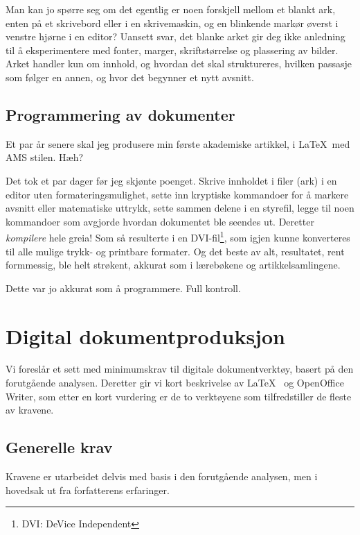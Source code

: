 Man kan jo spørre seg om det egentlig er noen forskjell mellom et blankt ark, enten på et skrivebord eller i en skrivemaskin, og en blinkende markør øverst i venstre hjørne i en editor? Uansett svar, det blanke arket gir deg ikke anledning til å eksperimentere med fonter, marger, skriftstørrelse og plassering av bilder. Arket handler kun om innhold, og hvordan det skal struktureres, hvilken passasje som følger en annen, og hvor det begynner et nytt avsnitt.

\subsection{Programmering av dokumenter}

Et par år senere skal jeg produsere min første akademiske artikkel, i \LaTeX~med  AMS stilen. Hæh?

Det tok et par dager før jeg skjønte poenget. Skrive innholdet i filer (ark) i en editor uten formateringsmulighet, sette inn kryptiske kommandoer for å markere avsnitt eller matematiske uttrykk, sette sammen delene i en styrefil, legge til noen kommandoer som avgjorde hvordan dokumentet ble seendes ut. Deretter {\em kompilere} hele greia! Som så resulterte i  en DVI-fil\footnote{DVI: DeVice Independent}, som igjen kunne konverteres til alle mulige trykk- og printbare formater. Og det beste av alt, resultatet, rent formmessig, ble helt strøkent, akkurat som i lærebøkene og artikkelsamlingene.

Dette var jo akkurat som å programmere. Full kontroll.


\section{Digital dokumentproduksjon}

Vi foreslår et sett med minimumskrav til digitale dokumentverktøy, basert på  den forutgående analysen. Deretter gir vi kort beskrivelse av 
\LaTeX~ og OpenOffice Writer, som etter en kort vurdering er de to verktøyene som tilfredstiller de fleste av kravene.

\subsection{Generelle krav}
\label{sec:generelle-krav}

Kravene er utarbeidet delvis med basis i den forutgående analysen, men i hovedsak ut fra forfatterens erfaringer.

